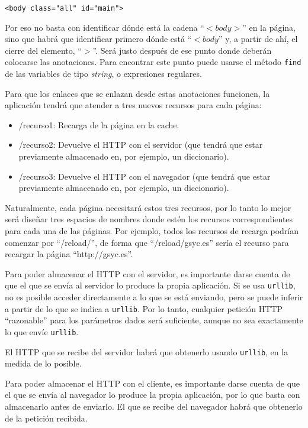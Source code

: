 \begin{verbatim}
<body class="all" id="main">
\end{verbatim}

Por eso no basta con identificar dónde está la cadena ``$<body>$'' en la página, sino que habrá que identificar primero dónde está ``$<body$'' y, a partir de ahí, el cierre del elemento, ``$>$''. Será justo después de ese punto donde deberán colocarse las anotaciones. Para encontrar este punto puede usarse el método \texttt{find} de las variables de tipo \emph{string}, o expresiones regulares.

Para que los enlaces que se enlazan desde estas anotaciones funcionen, la aplicación tendrá que atender a tres nuevos recursos para cada página:

\begin{itemize}
\item /recurso1: Recarga de la página en la cache.
\item /recurso2: Devuelve el HTTP con el servidor (que tendrá que estar previamente almacenado en, por ejemplo, un diccionario).
\item /recurso3: Devuelve el HTTP con el navegador (que tendrá que estar previamente almacenado en, por ejemplo, un diccionario).
\end{itemize}

Naturalmente, cada página necesitará estos tres recursos, por lo tanto lo mejor será diseñar tres espacios de nombres donde estén los recursos correspondientes para cada una de las páginas. Por ejemplo, todos los recursos de recarga podrían comenzar por ``/reload/'', de forma que ``/reload/gsyc.es'' sería el recurso para recargar la página ``http://gsyc.es''.

Para poder almacenar el HTTP con el servidor, es importante darse cuenta de que el que se envía al servidor lo produce la propia aplicación. Si se usa \texttt{urllib}, no es posible acceder directamente a lo que se está enviando, pero se puede inferir a partir de lo que se indica a \texttt{urllib}. Por lo tanto, cualquier petición HTTP ``razonable'' para los parámetros dados será suficiente, aunque no sea exactamente lo que envíe \texttt{urllib}.

El HTTP que se recibe del servidor habrá que obtenerlo usando \texttt{urllib}, en la medida de lo posible.

Para poder almacenar el HTTP con el cliente, es importante darse cuenta de que el que se envía al navegador lo produce la propia aplicación, por lo que basta con almacenarlo antes de enviarlo. El que se recibe del navegador habrá que obtenerlo de la petición recibida.

